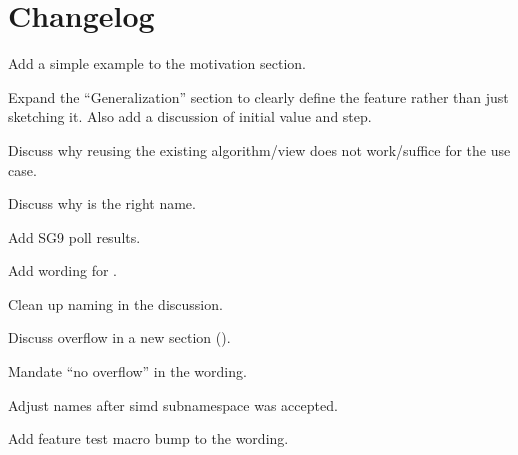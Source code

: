 \section{Changelog}
\begin{revision}
\item Add a simple example to the motivation section.
\item Expand the “Generalization” section to clearly define the feature rather
  than just sketching it.
  Also add a discussion of initial value and step.
\item Discuss why reusing the existing  algorithm/view does not
  work/suffice for the  use case.
\item Discuss why  is the right name.
\end{revision}

\begin{revision}
\item Add SG9 poll results.
\item Add wording for .
\end{revision}

\begin{revision}
\item Clean up naming in the discussion.
\item Discuss overflow in a new section ().
\item Mandate “no overflow” in the wording.
\end{revision}

\begin{revision}
\item Adjust names after simd subnamespace was accepted.
\item Add feature test macro bump to the wording.
\end{revision}
